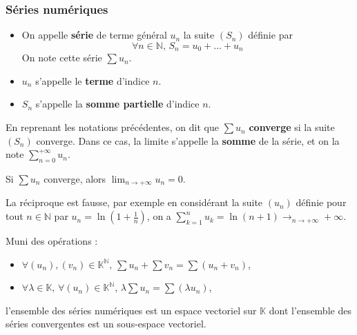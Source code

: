 	\subsubsection{Séries numériques}

	\label{223-3}


	\begin{definition}
		\begin{itemize}
			\item On appelle \textbf{série} de terme général $u_n$ la suite $(S_n)$ définie par
			\[ \forall n \in \mathbb{N}, \, S_n = u_0 + \dots + u_n \]
			On note cette série $\sum u_n$.
			\item $u_n$ s'appelle le \textbf{terme} d'indice $n$.
			\item $S_n$ s'appelle la \textbf{somme partielle} d'indice $n$.
		\end{itemize}
	\end{definition}

	\begin{definition}
		En reprenant les notations précédentes, on dit que $\sum u_n$ \textbf{converge} si la suite $(S_n)$ converge. Dans ce cas, la limite s'appelle la \textbf{somme} de la série, et on la note $\sum_{n=0}^{+\infty} u_n$.
	\end{definition}


	\begin{proposition}
		Si $\sum u_n$ converge, alors $\lim_{n \rightarrow +\infty} u_n = 0$.
	\end{proposition}

	\begin{cexample}
		La réciproque est fausse, par exemple en considérant la suite $(u_n)$ définie pour tout $n \in \mathbb{N}$ par $u_n = \ln(1 + \frac{1}{n})$, on a $\sum_{k=1}^{n} u_k = \ln(n+1) \longrightarrow_{n \rightarrow +\infty} +\infty$.
	\end{cexample}

	\begin{proposition}
		Muni des opérations :
		\begin{itemize}
			\item $\forall (u_n), (v_n) \in \mathbb{K}^{\mathbb{N}}, \, \sum u_n + \sum v_n = \sum (u_n + v_n)$,
			\item $\forall \lambda \in \mathbb{K}, \, \forall (u_n) \in \mathbb{K}^{\mathbb{N}}, \, \lambda \sum u_n = \sum (\lambda u_n)$,
		\end{itemize}
		l'ensemble des séries numériques est un espace vectoriel sur $\mathbb{K}$ dont l'ensemble des séries convergentes est un sous-espace vectoriel.
	\end{proposition}

